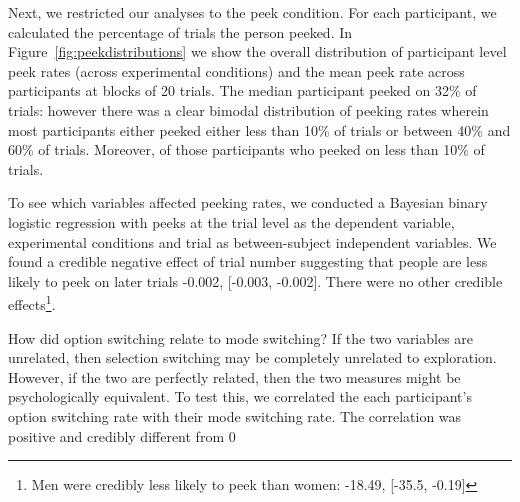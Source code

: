 \documentclass[a4paper,doc,natbib,floatsintext]{apa6}\usepackage[]{graphicx}\usepackage[]{color}
\begin{document}
Next, we restricted our analyses to the peek condition. For each participant, we calculated the percentage of trials the person peeked. In Figure~\ref{fig:peekdistributions} we show the overall distribution of participant level peek rates (across experimental conditions) and the mean peek rate across participants at blocks of 20 trials. The median participant peeked on 32\% of trials: however there was a clear bimodal distribution of peeking rates wherein most participants either peeked either less than 10\% of trials or between 40\% and 60\% of trials. Moreover, of those participants who peeked on less than 10\% of trials.



To see which variables affected peeking rates, we conducted a Bayesian binary logistic regression with peeks at the trial level as the dependent variable, experimental conditions and trial as between-subject independent variables. We found a credible negative effect of trial number suggesting that people are less likely to peek on later trials -0.002, [-0.003, -0.002]. There were no other credible effects\footnote{Men were credibly less likely to peek than women: -18.49, [-35.5, -0.19]}.

How did option switching relate to mode switching? If the two variables are unrelated, then selection switching may be completely unrelated to exploration. However, if the two are perfectly related, then the two measures might be psychologically equivalent. To test this, we correlated the each participant's option switching rate with their mode switching rate. The correlation was positive and credibly different from 0 %
\end{document}
